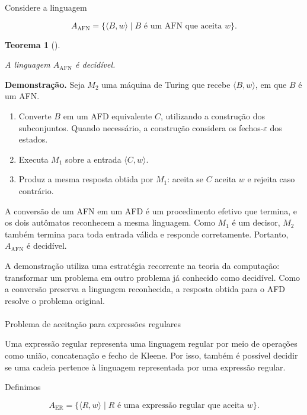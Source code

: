 \documentclass[
  brazilian,
  letterpaper,
]{book}
\makeatletter
\let\oldparagraph\paragraph
\renewcommand{\paragraph}{
    \@ifstar
      \xxxParagraphStar
      \xxxParagraphNoStar
  }
\newcommand{\xxxParagraphStar}[1]{\oldparagraph*{#1}\mbox{}}
\newcommand{\xxxParagraphNoStar}[1]{\oldparagraph{#1}\mbox{}}
\providecommand{\tightlist}{%
  \setlength{\itemsep}{0pt}\setlength{\parskip}{0pt}}
\theoremstyle{plain}
\newtheorem{theorem}{Teorema}[chapter]
\theoremstyle{definition}
\theoremstyle{remark}
\makeatother
\begin{document}
Considere a linguagem

\[
A_{\mathrm{AFN}}=\{\langle B,w\rangle\mid B\text{ é um AFN que aceita }w\}.
\]

\begin{theorem}[]\protect\hypertarget{thm-afn}{}\label{thm-afn}

A linguagem \(A_{\mathrm{AFN}}\) é decidível.

\end{theorem}

\textbf{Demonstração.} Seja \(M_2\) uma máquina de Turing que recebe
\(\langle B,w\rangle\), em que \(B\) é um AFN.

\begin{enumerate}
\def\labelenumi{\arabic{enumi}.}
\tightlist
\item
  Converte \(B\) em um AFD equivalente \(C\), utilizando a construção
  dos subconjuntos. Quando necessário, a construção considera os
  fechos-\(\varepsilon\) dos estados.
\item
  Executa \(M_1\) sobre a entrada \(\langle C,w\rangle\).
\item
  Produz a mesma resposta obtida por \(M_1\): aceita se \(C\) aceita
  \(w\) e rejeita caso contrário.
\end{enumerate}

A conversão de um AFN em um AFD é um procedimento efetivo que termina, e
os dois autômatos reconhecem a mesma linguagem. Como \(M_1\) é um
decisor, \(M_2\) também termina para toda entrada válida e responde
corretamente. Portanto, \(A_{\mathrm{AFN}}\) é decidível.

A demonstração utiliza uma estratégia recorrente na teoria da
computação: transformar um problema em outro problema já conhecido como
decidível. Como a conversão preserva a linguagem reconhecida, a resposta
obtida para o AFD resolve o problema original.

\paragraph{Problema de aceitação para expressões
regulares}\label{problema-de-aceitauxe7uxe3o-para-expressuxf5es-regulares}

Uma expressão regular representa uma linguagem regular por meio de
operações como união, concatenação e fecho de Kleene. Por isso, também é
possível decidir se uma cadeia pertence à linguagem representada por uma
expressão regular.

Definimos

\[
A_{\mathrm{ER}}=\{\langle R,w\rangle\mid R\text{ é uma expressão regular que aceita }w\}.
\]
\end{document}
